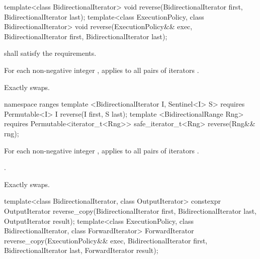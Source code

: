 %
\begin{itemdecl}
template<class BidirectionalIterator>
  void reverse(BidirectionalIterator first, BidirectionalIterator last);
template<class ExecutionPolicy, class BidirectionalIterator>
  void reverse(ExecutionPolicy&& exec,
               BidirectionalIterator first, BidirectionalIterator last);
\end{itemdecl}

\begin{itemdescr}
\pnum
\requires
{} shall satisfy the
 requirements.

\pnum
\effects
For each non-negative integer
,
applies
to all pairs of iterators
.

\pnum
\complexity
Exactly
swaps.
\end{itemdescr}

\begin{addedblock}
%
\begin{itemdecl}
namespace ranges {
  template <BidirectionalIterator I, Sentinel<I> S>
      requires Permutable<I>
    I reverse(I first, S last);
  template <BidirectionalRange Rng>
      requires Permutable<iterator_t<Rng>>
    safe_iterator_t<Rng> reverse(Rng&& rng);
}
\end{itemdecl}

\begin{itemdescr}
\pnum
\effects
For each non-negative integer
,
applies
to all pairs of iterators
.

\pnum
\returns {}.

\pnum
\complexity
Exactly
swaps.
\end{itemdescr}
\end{addedblock}

%
\begin{itemdecl}
template<class BidirectionalIterator, class OutputIterator>
  constexpr OutputIterator
    reverse_copy(BidirectionalIterator first, BidirectionalIterator last,
                 OutputIterator result);
template<class ExecutionPolicy, class BidirectionalIterator, class ForwardIterator>
  ForwardIterator
    reverse_copy(ExecutionPolicy&& exec,
                 BidirectionalIterator first, BidirectionalIterator last,
                 ForwardIterator result);
\end{itemdecl}

